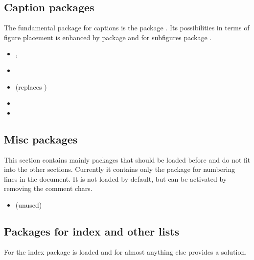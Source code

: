
\subsection{Caption packages}

The fundamental package for captions is the package .  Its possibilities in terms of figure placement is enhanced by package  and for subfigures package .

\begin{itemize}[noitemsep]
\item {}, 
\item {}
\item {} (replaces )
\item {}
\item {}
\end{itemize}


\subsection{Misc packages}
\label{sec:packages:misc}
This section contains mainly packages that should be loaded before  and do not fit into the other sections.
Currently it contains only the package  for numbering lines
in the document. It is not loaded by default, but can be activated by removing the comment chars.

\begin{itemize}[noitemsep]
\item {} (unused)
\end{itemize}


\subsection{Packages for index and other lists}
For the index package  is loaded and for almost anything else  provides a solution.

